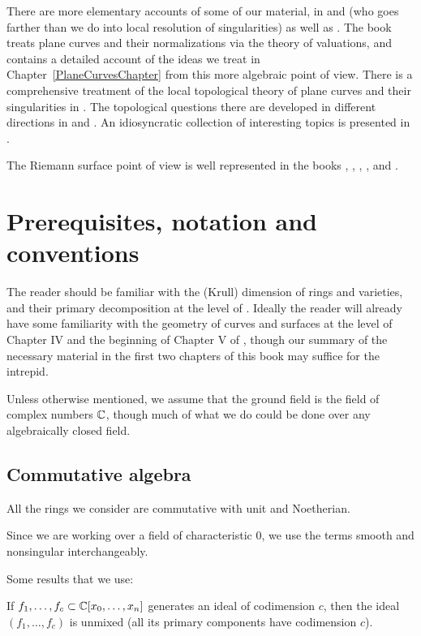 There are more elementary accounts of some of our material, in \cite{Fulton1989} and \cite{Walker1978} (who goes farther than we do into local resolution of singularities) as well as \cite{Griffiths-curves}. The book \cite{Kunz} treats plane curves and their normalizations via the theory of valuations, and contains a detailed  account of the ideas we treat in Chapter~\ref{PlaneCurvesChapter} from this more algebraic point of view.  There is a comprehensive treatment of the local topological theory of plane curves and their singularities in \cite{Brieskorn1986}. The topological questions there are developed in different directions in \cite{MR0239612} %
 and \cite{MR817982}. %
 An  idiosyncratic collection of interesting topics is presented in \cite{Clemens-Scrapbook}.

 The Riemann surface point of view is well represented in the books \cite{Forster}, \cite{Gunning}, \cite{Gunning-2}, \cite{Kirwan}, and \cite{Miranda}. 


\section*{Prerequisites, notation and conventions}
The reader should be familiar with the 
(Krull)
dimension of rings and
%
%
varieties, and their 
primary decomposition 
at the level of
\cite{Atiyah-MacDonald}. Ideally the reader  will already have some
familiarity with the geometry of curves and surfaces 
at the level of 
Chapter IV and the beginning of Chapter V of
\cite{Hartshorne1977}, though our summary of the necessary material
in the first two chapters of this book may suffice for the intrepid.

Unless otherwise mentioned, we assume that the ground field is the
field of complex numbers
%
$\CC$, though much of what we do
could be done over any algebraically closed field.

\subsection*{Commutative algebra} 
All the rings we consider are commutative with unit and Noetherian.

Since we are working over  a field of characteristic 0, we use the
terms smooth and nonsingular interchangeably.

Some results that we use:
 \begin{theorem}\label{Lasker}
If $f_1,\dots, f_c \subset \CC[x_0,\dots, x_n]$ generates an ideal of codimension $c$, then 
the ideal $(f_1,\dots, f_c)$ is unmixed (all its primary components have codimension $c$).
%
\end{theorem}

